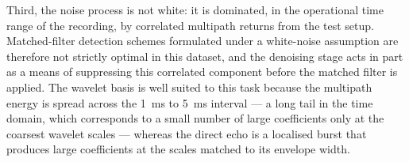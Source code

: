 Third, the noise process is not white: it is dominated, in the
operational time range of the recording, by correlated multipath
returns from the test setup. Matched-filter detection schemes
formulated under a white-noise assumption are therefore not
strictly optimal in this dataset, and the denoising stage acts in
part as a means of suppressing this correlated component before
the matched filter is applied. The wavelet basis is well suited to
this task because the multipath energy is spread across the
\SI{1}{\milli\second} to \SI{5}{\milli\second} interval --- a long
tail in the time domain, which corresponds to a small number of
large coefficients only at the coarsest wavelet scales --- whereas
the direct echo is a localised burst that produces large
coefficients at the scales matched to its envelope width.

%
%
%
%
%
%
%
